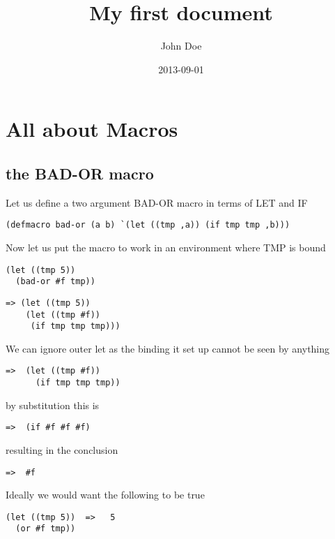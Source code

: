 \documentclass{article}
\title{My first document}
\date{2013-09-01}
\author{John Doe}
\begin{document}
\maketitle
\newpage
{}

\section{All about Macros}

\subsection{the BAD-OR macro}

Let us define a two argument BAD-OR macro in terms of LET and IF

\begin{verbatim}
(defmacro bad-or (a b) `(let ((tmp ,a)) (if tmp tmp ,b)))
\end{verbatim}

Now let us put the macro to work in an environment where TMP is bound

\begin{verbatim}
(let ((tmp 5)) 
  (bad-or #f tmp))
\end{verbatim}

\begin{verbatim}
=> (let ((tmp 5)) 
    (let ((tmp #f))
     (if tmp tmp tmp)))
\end{verbatim}

We can ignore outer let as the binding it set up cannot be seen by anything

\begin{verbatim}
=>  (let ((tmp #f))
      (if tmp tmp tmp))
\end{verbatim}

by substitution this is 

\begin{verbatim}
=>  (if #f #f #f)
\end{verbatim}

resulting in the conclusion

\begin{verbatim}
=>  #f
\end{verbatim}

Ideally we would want the following to be true

\begin{verbatim}
(let ((tmp 5))  =>   5
  (or #f tmp))
\end{verbatim}
\end{document}
